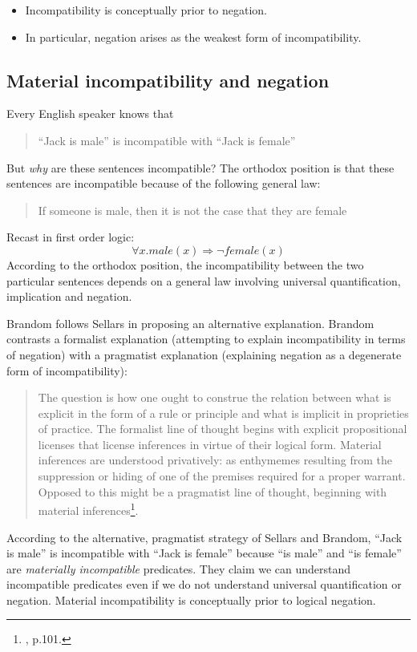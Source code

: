 \begin{itemize}

\item Incompatibility is conceptually prior to negation.

\item In particular, negation arises as the weakest form of incompatibility.

\end{itemize}

\subsection{Material incompatibility and negation}

\NI Every English speaker knows that
\begin{quote}
``Jack is male'' is incompatible with ``Jack is female''
\end{quote}

\NI But \emph{why} are these sentences incompatible? The orthodox
position is that these sentences are incompatible because of the
following general law:
\begin{quote}
If someone is male, then it is not the case that they are female
\end{quote}
Recast in first order logic:
\[
\forall x. male(x) \Rightarrow \neg female(x)
\]
According to the orthodox position, the incompatibility between the
two particular sentences depends on a general law involving universal
quantification, implication and negation.

Brandom \cite{brandom2} follows Sellars in proposing an alternative explanation.
Brandom contrasts a formalist explanation (attempting to explain incompatibility in terms of negation) with a pragmatist explanation (explaining negation as a degenerate form of incompatibility):
\begin{quote}
The question is how one ought to construe the relation between what is explicit in the form of a rule or principle and what is implicit in proprieties of practice. 
The formalist line of thought begins with explicit propositional licenses that license inferences in virtue of their logical form. Material inferences are understood privatively: as enthymemes resulting from the suppression or hiding of one of the premises required for a proper warrant. 
Opposed to this might be a pragmatist line of thought, beginning with material inferences\footnote{\cite{brandom2}, p.101.}.
\end{quote}
According to the alternative, pragmatist strategy of Sellars and Brandom, ``Jack
is male'' is incompatible with ``Jack is female'' because ``is male''
and ``is female'' are \emph{materially incompatible} predicates.  They
claim we can understand incompatible predicates even if we do
not understand universal quantification or negation.  
Material incompatibility is conceptually prior to logical negation.

